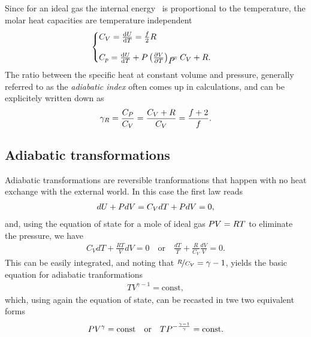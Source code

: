 Since for an ideal gas the internal energy~\label{eq:ideal_gas_internal_energy} is
proportional to the temperature, the molar heat capacities are temperature
independent
\begin{align*}
  \begin{cases}
    C_V = \dv{U}{T} = \frac{f}{2}R\\[10pt]
    C_p = \dv{U}{T} + \pressure \parderr{V}{T}{\pressure} = C_V + R.
  \end{cases}
\end{align*}
The ratio between the specific heat at constant volume and pressure, generally referred
to as the \emph{adiabatic index} often comes up in calculations, and can
be explicitely written down as
\begin{align}
  \gamma_R = \frac{C_{P}}{C_V} = \frac{C_V + R}{C_V} = \frac{f + 2}{f}.
\end{align}



\subsection{Adiabatic transformations}

Adiabatic transformations are reversible tranformations that happen with no
heat exchange with the external world. In this case the first law reads
\begin{align*}
  dU + P dV = C_V dT + P dV = 0,
\end{align*}
and, using the equation of state for a mole of ideal gas $P V = RT$ to
eliminate the pressure, we have
\begin{align*}
  C_V dT + \frac{RT}{V} dV = 0
  \quad\text{or}\quad
  \frac{dT}{T} + \frac{R}{C_V} \frac{dV}{V} = 0.
\end{align*}
This can be easily integrated, and noting that $\nicefrac{R}{C_V} = \gamma - 1$,
yields the basic equation for adiabatic tranformations
\begin{align*}
  TV^{\gamma - 1} = \text{const},
\end{align*}
which, using again the equation of state, can be recasted in twe two equivalent
forms
\begin{align}
  P V^\gamma = \text{const}
  \quad\text{or}\quad
  TP^{-\frac{\gamma - 1}{\gamma}} = \text{const}.
\end{align}


